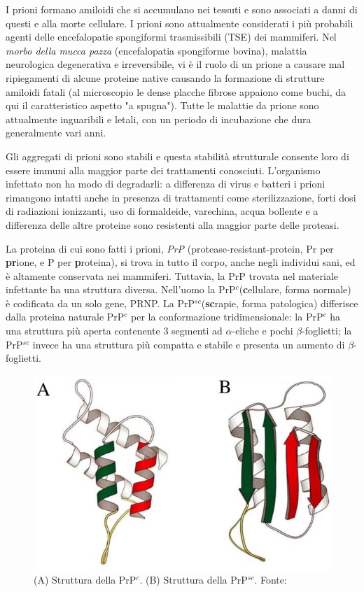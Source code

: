 {{\par I prioni formano amiloidi che si accumulano nei tessuti e sono associati a danni di questi e alla morte cellulare. I prioni sono attualmente considerati i più probabili agenti delle encefalopatie spongiformi trasmissibili (TSE) dei mammiferi. Nel \textit{morbo della mucca pazza} (encefalopatia spongiforme bovina), malattia neurologica degenerativa e irreversibile, vi è il ruolo di un prione a causare mal ripiegamenti di alcune proteine native causando la formazione di strutture amiloidi fatali (al microscopio le dense placche fibrose appaiono come buchi, da qui il caratteristico aspetto "a spugna"). Tutte le malattie da prione sono attualmente inguaribili e letali, con un periodo di incubazione che dura generalmente vari anni.

\par Gli aggregati di prioni sono stabili e questa stabilità strutturale consente loro di essere immuni alla maggior parte dei trattamenti conosciuti. L'organismo infettato non ha modo di degradarli: a differenza di virus e batteri i prioni rimangono intatti anche in presenza di trattamenti come sterilizzazione, forti dosi di radiazioni ionizzanti, uso di formaldeide, varechina, acqua bollente e a differenza delle altre proteine sono resistenti alla maggior parte delle proteasi.

\par La proteina di cui sono fatti i prioni, \textit{PrP} (protease-resistant-protein, Pr per \textbf{pr}ione, e P per \textbf{p}roteina), si trova in tutto il corpo, anche negli individui sani, ed è altamente conservata nei mammiferi. Tuttavia, la PrP trovata nel materiale infettante ha una struttura diversa. Nell'uomo la PrP$^{c}$(\textbf{c}ellulare, forma normale) è codificata da un solo gene, PRNP. La PrP$^{sc}$(\textbf{sc}rapie, forma patologica) differisce dalla proteina naturale PrP$^{c}$ per la conformazione tridimensionale: la PrP$^{c}$ ha una struttura più aperta contenente 3 segmenti ad $\alpha$-eliche e pochi $\beta$-foglietti; la PrP$^{sc}$ invece ha una struttura più compatta e stabile e presenta un aumento di $\beta$-foglietti.

\begin{figure}[h]
	\centering
	\includegraphics{images/PrPc.jpg}
	\caption{(A) Struttura della PrP$^{c}$. (B) Struttura della PrP$^{sc}$. Fonte: \cite{ruttkay2015prion}}
	\label{fig:PrPc}
\end{figure} 

}}
